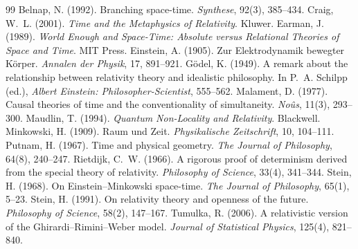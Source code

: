 \documentclass{situationist-preprint}
\begin{document}
\begin{thebibliography}{99}\small
{} Belnap, N. (1992). Branching space-time. \emph{Synthese}, 92(3), 385--434.
 Craig, W.~L. (2001). \emph{Time and the Metaphysics of Relativity}. Kluwer.
 Earman, J. (1989). \emph{World Enough and Space-Time: Absolute versus Relational Theories of Space and Time}. MIT Press.
 Einstein, A. (1905). Zur Elektrodynamik bewegter K\"orper. \emph{Annalen der Physik}, 17, 891--921.
 G\"odel, K. (1949). A remark about the relationship between relativity theory and idealistic philosophy. In P.~A. Schilpp (ed.), \emph{Albert Einstein: Philosopher-Scientist}, 555--562.
 Malament, D. (1977). Causal theories of time and the conventionality of simultaneity. \emph{No\^us}, 11(3), 293--300.
 Maudlin, T. (1994). \emph{Quantum Non-Locality and Relativity}. Blackwell.
 Minkowski, H. (1909). Raum und Zeit. \emph{Physikalische Zeitschrift}, 10, 104--111.
 Putnam, H. (1967). Time and physical geometry. \emph{The Journal of Philosophy}, 64(8), 240--247.
 Rietdijk, C.~W. (1966). A rigorous proof of determinism derived from the special theory of relativity. \emph{Philosophy of Science}, 33(4), 341--344.
 Stein, H. (1968). On Einstein--Minkowski space-time. \emph{The Journal of Philosophy}, 65(1), 5--23.
 Stein, H. (1991). On relativity theory and openness of the future. \emph{Philosophy of Science}, 58(2), 147--167.
 Tumulka, R. (2006). A relativistic version of the Ghirardi--Rimini--Weber model. \emph{Journal of Statistical Physics}, 125(4), 821--840.
\end{thebibliography}
\end{document}
